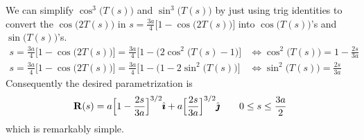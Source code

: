 \begin{eg}
We can simplify $\cos^3\big(T(s)\big)$ and $\sin^3\big(T(s)\big)$
by just using trig identities to convert the  $\cos\big(2T(s)\big)$
in $s=\frac{3a}{4}\big[1-\cos\big(2T(s)\big)\big]$
into $\cos\big(T(s)\big)$'s and $\sin\big(T(s)\big)$'s.
\begin{align*}
s=\frac{3a}{4}\big[1-\cos\big(2T(s)\big)\big]
=\frac{3a}{4}\big[1-\big(2\cos^2\big(T(s)-1\big)\big]
&\iff \cos^2\big(T(s)\big)=1-\frac{2s}{3a} \\
s=\frac{3a}{4}\big[1-\cos\big(2T(s)\big)\big]
=\frac{3a}{4}\big[1-\big(1-2\sin^2\big(T(s)\big)\big]
&\iff \sin^2\big(T(s)\big)=\frac{2s}{3a}
\end{align*}
Consequently the desired parametrization is
\begin{equation*}
\mathbf{R}(s) = a\Big[1-\frac{2s}{3a}\Big]^{3/2}\hat{\pmb{\imath}}
        + a\Big[\frac{2s}{3a}\Big]^{3/2}\hat{\pmb{\jmath}}
\qquad
0\le s \le \frac{3a}{2}
\end{equation*}
which is remarkably simple.
\end{eg}


